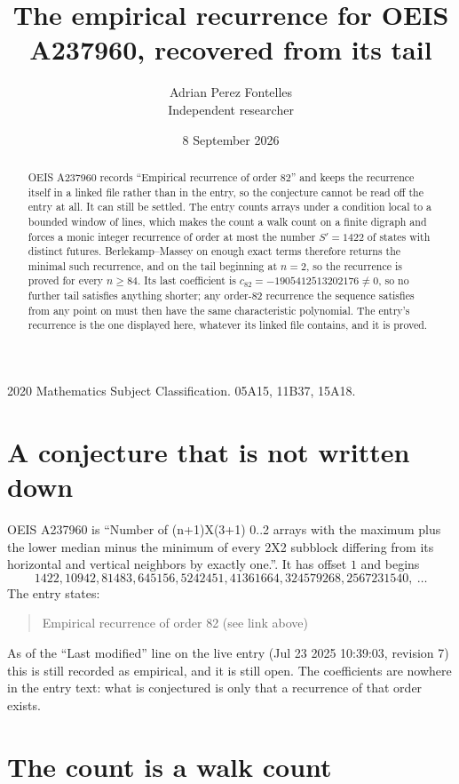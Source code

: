 \documentclass[11pt,a4paper]{article}
\title{The empirical recurrence for OEIS A237960, recovered from its tail}
\author{Adrian Perez Fontelles\\ \small Independent researcher}
\date{8 September 2026}
\theoremstyle{plain}
\theoremstyle{definition}
\begin{document}
\maketitle

\begin{abstract}
OEIS A237960 records ``Empirical recurrence of order $82$'' and keeps the recurrence itself in
a linked file rather than in the entry, so the conjecture cannot be read off the entry at all.
It can still be settled. The entry counts arrays under a condition local to a bounded window of
lines, which makes the count a walk count on a finite digraph and forces a monic integer
recurrence of order at most the number $S'=1422$ of states with distinct futures. Berlekamp--Massey on
enough exact terms therefore returns the minimal such recurrence, and on the tail beginning at $n=2$, so the recurrence is proved for every $n\ge84$.
Its last coefficient is $c_{82}=-1905412513202176\neq0$, so no further tail satisfies anything
shorter; any order-$82$ recurrence the sequence satisfies from any point on must then have
the same characteristic polynomial. The entry's recurrence is the one displayed here, whatever
its linked file contains, and it is proved.
\end{abstract}

\noindent\small 2020 Mathematics Subject Classification. 05A15, 11B37, 15A18.\normalsize

\section{A conjecture that is not written down}

OEIS A237960 is ``Number of (n+1)X(3+1) 0..2 arrays with the maximum plus the lower median minus the minimum of every 2X2 subblock differing from its horizontal and vertical neighbors by exactly one.''. It has offset $1$ and begins
\[
1422, 10942, 81483, 645156, 5242451, 41361664, 324579268, 2567231540,\ \dots
\]
The entry states:
\begin{quote}
Empirical recurrence of order 82 (see link above)
\end{quote}
As of the ``Last modified'' line on the live entry (Jul 23 2025 10:39:03, revision 7)
this is still recorded as empirical, and it is still open. The coefficients are nowhere in the
entry text: what is conjectured is only that a recurrence of that order exists.

\section{The count is a walk count}
\end{document}
